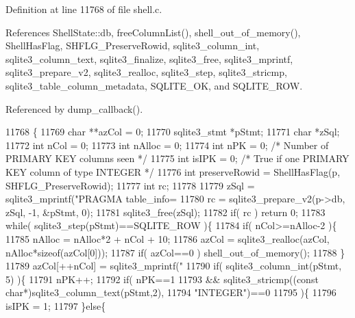 Definition at line 11768 of file shell.\+c.



References Shell\+State\+::db, free\+Column\+List(), shell\+\_\+out\+\_\+of\+\_\+memory(), Shell\+Has\+Flag, S\+H\+F\+L\+G\+\_\+\+Preserve\+Rowid, sqlite3\+\_\+column\+\_\+int, sqlite3\+\_\+column\+\_\+text, sqlite3\+\_\+finalize, sqlite3\+\_\+free, sqlite3\+\_\+mprintf, sqlite3\+\_\+prepare\+\_\+v2, sqlite3\+\_\+realloc, sqlite3\+\_\+step, sqlite3\+\_\+stricmp, sqlite3\+\_\+table\+\_\+column\+\_\+metadata, S\+Q\+L\+I\+T\+E\+\_\+\+OK, and S\+Q\+L\+I\+T\+E\+\_\+\+R\+OW.



Referenced by dump\+\_\+callback().


\begin{DoxyCode}
11768                                                               \{
11769   \textcolor{keywordtype}{char} **azCol = 0;
11770   sqlite3_stmt *pStmt;
11771   \textcolor{keywordtype}{char} *zSql;
11772   \textcolor{keywordtype}{int} nCol = 0;
11773   \textcolor{keywordtype}{int} nAlloc = 0;
11774   \textcolor{keywordtype}{int} nPK = 0;       \textcolor{comment}{/* Number of PRIMARY KEY columns seen */}
11775   \textcolor{keywordtype}{int} isIPK = 0;     \textcolor{comment}{/* True if one PRIMARY KEY column of type INTEGER */}
11776   \textcolor{keywordtype}{int} preserveRowid = ShellHasFlag(p, SHFLG_PreserveRowid);
11777   \textcolor{keywordtype}{int} rc;
11778 
11779   zSql = sqlite3_mprintf(\textcolor{stringliteral}{"PRAGMA table\_info=%
11780   rc = sqlite3_prepare_v2(p->db, zSql, -1, &pStmt, 0);
11781   sqlite3_free(zSql);
11782   \textcolor{keywordflow}{if}( rc ) \textcolor{keywordflow}{return} 0;
11783   \textcolor{keywordflow}{while}( sqlite3_step(pStmt)==SQLITE_ROW )\{
11784     \textcolor{keywordflow}{if}( nCol>=nAlloc-2 )\{
11785       nAlloc = nAlloc*2 + nCol + 10;
11786       azCol = sqlite3_realloc(azCol, nAlloc*\textcolor{keyword}{sizeof}(azCol[0]));
11787       \textcolor{keywordflow}{if}( azCol==0 ) shell_out_of_memory();
11788     \}
11789     azCol[++nCol] = sqlite3_mprintf(\textcolor{stringliteral}{"%
11790     \textcolor{keywordflow}{if}( sqlite3_column_int(pStmt, 5) )\{
11791       nPK++;
11792       \textcolor{keywordflow}{if}( nPK==1
11793        && sqlite3_stricmp((\textcolor{keyword}{const} \textcolor{keywordtype}{char}*)sqlite3_column_text(pStmt,2),
11794                           \textcolor{stringliteral}{"INTEGER"})==0
11795       )\{
11796         isIPK = 1;
11797       \}\textcolor{keywordflow}{else}\{
}}
\end{DoxyCode}
